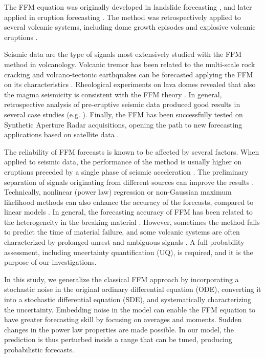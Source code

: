 \documentclass{article}
\begin{document}
The FFM equation was originally developed in landslide forecasting \citep{Fukuzuno1985, Voight1987, Voight1988b, Voight1989b}, and later applied in eruption forecasting \citep{Voight1988, Voight1989, Cornelius1995}. The method was retrospectively applied to several volcanic systems, including dome growth episodes and explosive volcanic eruptions \citep{Voight1991, Cornelius1994, Cornelius1996, Voight2000}. 

Seismic data are the type of signals most extensively studied with the FFM method in volcanology. Volcanic tremor has been related to the multi-scale rock cracking \citep{Kilburn1998,Ortiz2003,Kilburn2003,Smith2009} and volcano-tectonic earthquakes can be forecasted applying the FFM on its characteristics \citep{Tarraga2006}. Rheological experiments on lava domes revealed that also the magma seismicity is consistent with the FFM theory \citep{Lavallee2008}. In general, retrospective analysis of pre-eruptive seismic data produced good results in several case studies (e.g. \cite{Smith2010, Budi2013, Chardot2013}). Finally, the FFM has been successfully tested on Synthetic Aperture Radar acquisitions, opening the path to new forecasting applications based on satellite data \citep{Moretto2016}.

The reliability of FFM forecasts is known to be affected by several factors. When applied to seismic data, the performance of the method is usually higher on eruptions preceded by a single phase of seismic acceleration \citep{Boue2015}. The preliminary separation of signals originating from different sources can improve the results \citep{Salvage2016, Salvage2017}. Technically, nonlinear (power law) regression or non-Gaussian maximum likelihood methods can also enhance the accuracy of the forecasts, compared to linear models \citep{Bell2011, Bell2013}. In general, the forecasting accuracy of FFM has been related to the heterogeneity in the breaking material \citep{Vasseur2015}. However, sometimes the method fails to predict the time of material failure, and some volcanic systems are often characterized by prolonged unrest and ambiguous signals \citep{Chiodini2016}. A full probability assessment, including uncertainty quantification (UQ), is required, and it is the purpose of our investigations.

In this study, we generalize the classical FFM approach by incorporating a stochastic noise in the original ordinary differential equation (ODE), converting it into a stochastic differential equation (SDE), and systematically characterizing the uncertainty. Embedding noise in the model can enable the FFM equation to have greater forecasting skill by focusing on averages and moments. Sudden changes in the power law properties are made possible. In our model, the prediction is thus perturbed inside a range that can be tuned, producing probabilistic forecasts.
\end{document}
